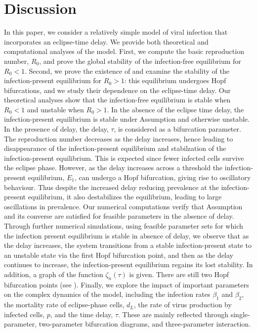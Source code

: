 \documentclass{CMHPhD-SIVD}
\begin{document}
\section{Discussion} \label{sec5}
In this paper, we consider a relatively simple model of viral infection that incorporates an eclipse-time delay.  We provide both theoretical and computational analyses of the model. First, we compute the basic reproduction number, $R_0$, and prove the global stability of the infection-free equilibrium for $R_0 < 1$. Second, we prove the existence of and examine the stability of the infection-present equilibrium for $R_0>1$: this equilibrium undergoes Hopf bifurcations, and we study their dependence on the eclipse-time delay.
Our theoretical analyses show that the infection-free equilibrium is stable when $R_0 < 1$ and unstable when $R_0 > 1$.
In the absence of the eclipse time delay, the infection-present equilibrium is stable under Assumption  and otherwise unstable.
In the presence of delay, the delay, $\tau$, is considered as a bifurcation parameter.  The reproduction number decreases as the delay increases, hence leading to disappearance of the infection-present equilibrium and stabilzation of the infection-present equilibrium.  This is expected since fewer infected cells survive the eclipse phase.  However, as the delay increases across a threshold the infection-present equilibrium, $E_1$, can undergo a Hopf bifurcation, giving rise to oscillatory behaviour.  Thus despite the increased delay reducing prevalence at the infection-present equilibrium, it also destabilizes the equilibrium, leading to large oscillations in prevalence.
Our numerical computations verify that Assumption  and its converse are satisfied for feasible parameters in the absence of delay.
Through further numerical simulations, using feasible parameter sets for which the infection present equilibrium is stable in absence of delay, we observe that as the delay increases, the system transitions from a stable infection-present state to an unstable state via the first Hopf bifurcation point, and then as the delay continues to increase, the infection-present equilibrium regains its lost stability. In addition, a graph of the function $\zeta_n(\tau)$ is given. There are still two Hopf bifurcation points (see ). Finally, we explore the impact of important parameters on the complex dynamics of the model,  including the infection rates $\beta_1$ and $\beta_2$, the mortality rate of eclipse-phase cells, $d_L$, the rate of virus production by infected cells, $p$, and the time delay, $\tau$. These are mainly reflected through single-parameter, two-parameter bifurcation diagrams, and three-parameter interaction.
\end{document}
